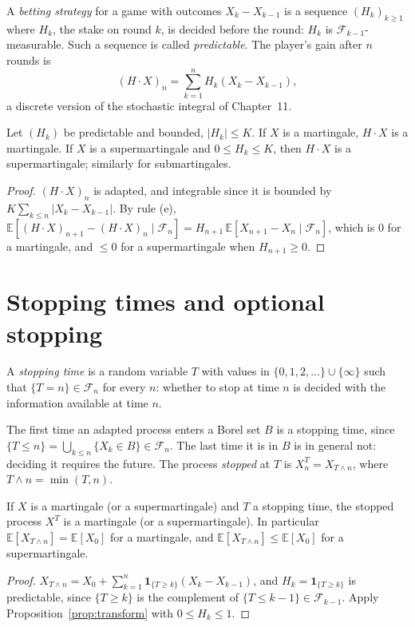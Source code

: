A \emph{betting strategy} for a game with outcomes $X_k-X_{k-1}$ is a sequence $(H_k)_{k\ge1}$ where $H_k$, the stake on round $k$, is decided
before the round: $H_k$ is $\mathcal F_{k-1}$-measurable. Such a sequence is called \emph{predictable}. The player's gain after $n$ rounds is
\[
(H\cdot X)_n=\sum_{k=1}^nH_k(X_k-X_{k-1}),
\]
a discrete version of the stochastic integral of Chapter~11.

\begin{proposition}\label{prop:transform}
Let $(H_k)$ be predictable and bounded, $|H_k|\le K$. If $X$ is a martingale, $H\cdot X$ is a martingale. If $X$ is a supermartingale
and $0\le H_k\le K$, then $H\cdot X$ is a supermartingale; similarly for submartingales.
\end{proposition}
\begin{proof}
$(H\cdot X)_n$ is adapted, and integrable since it is bounded by $K\sum_{k\le n}|X_k-X_{k-1}|$. By rule (e),
$\mathbb E[(H\cdot X)_{n+1}-(H\cdot X)_n\mid\mathcal F_n]=H_{n+1}\,\mathbb E[X_{n+1}-X_n\mid\mathcal F_n]$, which is $0$ for a martingale, and $\le0$ for a supermartingale when $H_{n+1}\ge0$.
\end{proof}

\section{Stopping times and optional stopping}

\begin{definition}\label{def:stopping}
A \emph{stopping time} is a random variable $T$ with values in $\{0,1,2,\ldots\}\cup\{\infty\}$ such that $\{T=n\}\in\mathcal F_n$ for every $n$: whether to stop at
time $n$ is decided with the information available at time $n$.
\end{definition}

The first time an adapted process enters a Borel set $B$ is a stopping time, since $\{T\le n\}=\bigcup_{k\le n}\{X_k\in B\}\in\mathcal F_n$. The last time it is in $B$ is
in general not: deciding it requires the future. The process \emph{stopped} at $T$ is $X^T_n=X_{T\wedge n}$, where $T\wedge n=\min(T,n)$.

\begin{proposition}\label{prop:stopped}
If $X$ is a martingale (or a supermartingale) and $T$ a stopping time, the stopped process $X^T$ is a martingale (or a supermartingale).
In particular $\mathbb E[X_{T\wedge n}]=\mathbb E[X_0]$ for a martingale, and $\mathbb E[X_{T\wedge n}]\le\mathbb E[X_0]$ for a supermartingale.
\end{proposition}
\begin{proof}
$X_{T\wedge n}=X_0+\sum_{k=1}^n\mathbf 1_{\{T\ge k\}}(X_k-X_{k-1})$, and $H_k=\mathbf 1_{\{T\ge k\}}$ is predictable, since $\{T\ge k\}$ is the complement of $\{T\le k-1\}\in\mathcal F_{k-1}$.
Apply Proposition~\ref{prop:transform} with $0\le H_k\le1$.
\end{proof}

